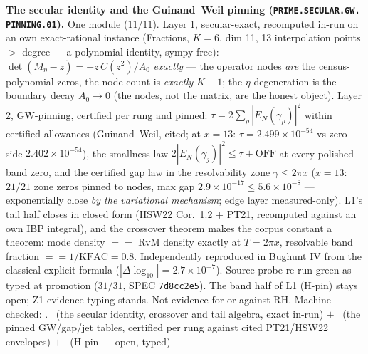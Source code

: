 \documentclass[11pt,a4paper]{article}
\theoremstyle{definition}
\begin{document}
\par\smallskip\noindent\textbf{The secular identity and the
Guinand--Weil pinning
(\texttt{PRIME.\allowbreak SECULAR.\allowbreak GW.\allowbreak
PINNING.01}).}
One module ($11/11$).  Layer 1, secular-exact, recomputed in-run
on an own exact-rational instance (Fractions, $K = 6$, dim 11,
13 interpolation points $>$ degree --- a polynomial identity,
sympy-free): $\det(M_\eta - z) = -z\,C(z^2)/A_0$ \emph{exactly}
--- the operator nodes \emph{are} the census-polynomial zeros,
the node count is \emph{exactly} $K - 1$; the $\eta$-degeneration
is the boundary decay $A_0 \to 0$ (the nodes, not the matrix,
are the honest object).  Layer 2, GW-pinning, certified per rung
and pinned: $\tau = 2\sum_\rho |E_N(\gamma_\rho)|^2$ within
certified allowances (Guinand--Weil, cited; at $x = 13$:
$\tau = 2.499\times10^{-54}$ vs zero-side $2.402\times10^{-54}$),
the smallness law $2|E_N(\gamma_j)|^2 \le \tau + \mathrm{OFF}$
at every polished band zero, and the certified gap law in the
resolvability zone $\gamma \le 2\pi x$ ($x = 13$: $21/21$ zone
zeros pinned to nodes, max gap $2.9\times10^{-17} \le
5.6\times10^{-8}$ --- exponentially close \emph{by the
variational mechanism}; edge layer measured-only).  L1's tail
half closes in closed form (HSW22 Cor.~1.2 $+$ PT21, recomputed
against an own IBP integral), and the crossover theorem makes
the corpus constant a theorem: mode density $==$ RvM density
exactly at $T = 2\pi x$, resolvable band fraction $==
1/\mathrm{KFAC} = 0.8$.  Independently reproduced in Bughunt IV
from the classical explicit formula ($|\Delta\log_{10}| =
2.7\times10^{-7}$).  Source probe re-run green as typed at
promotion ($31/31$, SPEC \texttt{7d8cc2e5}).  The band half of
L1 (H-pin) stays open; Z1 evidence typing stands.  Not evidence
for or against RH.
Machine-checked: .
\mE\ (the secular identity, crossover and tail algebra, exact
in-run) $+$ \mC\ (the pinned GW/gap/jet tables, certified per
rung against cited PT21/HSW22 envelopes) $+$ \mO\ (H-pin ---
open, typed)
\par\smallskip
\end{document}
